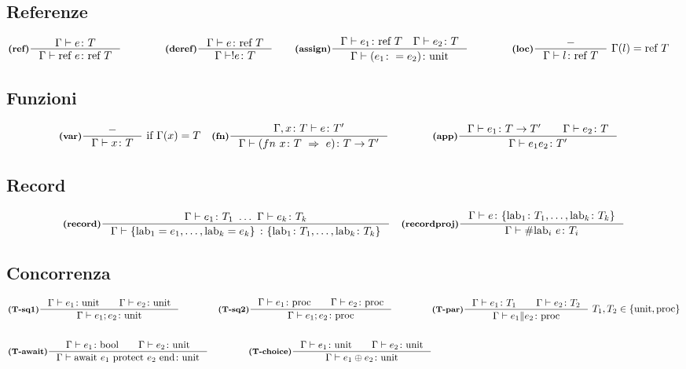 \documentclass[a4paper, 10pt]{article}
\newcommand{\bool}{\textup{bool}}
\theoremstyle{definition}
\newcommand{\infer}[4]{\inference[\textbf{#1}]{#2}{#3}#4 }
\begin{document}
\begin{minipage}{.45\linewidth}
\begin{flushleft}
\subsection*{Referenze}
	\begin{align*}
		&\infer{(ref)}{\Gamma\vdash e \colon T}{\Gamma\vdash \text{ref } e\colon \text{ref } T}{}  \qquad  \qquad
		\infer{(deref)}{\Gamma\vdash e \colon\text{ref } T}{\Gamma\vdash !e \colon T}{} \qquad
		\infer{(assign)}{\Gamma\vdash e_1\colon \text{ref } T\quad \Gamma\vdash e_2\colon T }{\Gamma\vdash (e_1 \colon = e_2)\colon \text{unit}}{}\qquad  \qquad
		\infer{(loc)}{-}{\Gamma\vdash l\colon \text{ref } T}{\ \Gamma (l) = \text{ref } T}
	\end{align*}
\subsection*{Funzioni}
	\begin{align*}
		&\infer{(var)}{-}{\Gamma \vdash x \colon T}{\ \textup{if}\ \Gamma (x) = T} 
		&\infer{(fn)}{\Gamma , x \colon T \vdash e\colon T'}{\Gamma\vdash (fn\ x\colon T\ \Rightarrow\ e )\colon T\rightarrow T'}{} \qquad\qquad
		&\infer{(app)}{\Gamma \vdash e_1 \colon T \rightarrow T'\qquad \Gamma\vdash e_2\colon T}{\Gamma\vdash e_1 e_2\colon T'}{} 
	\end{align*}
\subsection*{Record}
	\begin{align*}
		&\infer{(record)}{\Gamma \vdash e_1 \colon T_1\ \dots\ \Gamma \vdash e_k \colon T_k}{\Gamma \vdash \{\text{lab}_1 = e_1, \dots, \text{lab}_k = e_k \}\ \colon \{\text{lab}_1 \colon T_1,\dots, \text{lab}_k\colon T_k  \} }{}
		&\infer{(recordproj)}{\Gamma\vdash e\colon \{\text{lab}_1\colon T_1,\dots, \text{lab}_k\colon T_k \} }{\Gamma\vdash \# \text{lab}_i\ e \colon T_i}{}
	\end{align*}
\subsection*{Concorrenza}
	\begin{align*}
		&\infer{(T-sq1)}{\Gamma\vdash e_1\colon\textup{unit}\qquad \Gamma\vdash e_2\colon\textup{unit}}{\Gamma\vdash e_1;e_2\colon \textup{unit}}{}
		&\infer{(T-sq2)}{\Gamma\vdash e_1\colon\textup{proc}\qquad \Gamma\vdash e_2\colon\textup{proc}}{\Gamma\vdash e_1;e_2\colon \textup{proc}}{} \qquad\qquad
		&\infer{(T-par)}{\Gamma\vdash e_1\colon T_1\qquad \Gamma\vdash e_2\colon T_2}{\Gamma\vdash e_1 \| e_2\colon \textup{proc}}{\ T_1, T_2 \in \{\textup{unit}, \textup{proc}\}} \\ \\
		&\infer{(T-await)}{\Gamma\vdash e_1 \colon \bool\qquad \Gamma\vdash e_2\colon \textup{unit}}{
			\Gamma\vdash \textup{await}\ e_1\ \textup{protect}\ e_2\ \textup{end}\colon \textup{unit} }{} 
		&\infer{(T-choice)}{\Gamma\vdash e_1 \colon \textup{unit}\qquad \Gamma\vdash e_2\colon \textup{unit}}{\Gamma\vdash e_1 \oplus e_2\colon \textup{unit}}{}
	\end{align*}
	\end{flushleft}
\end{minipage}
\end{document}
